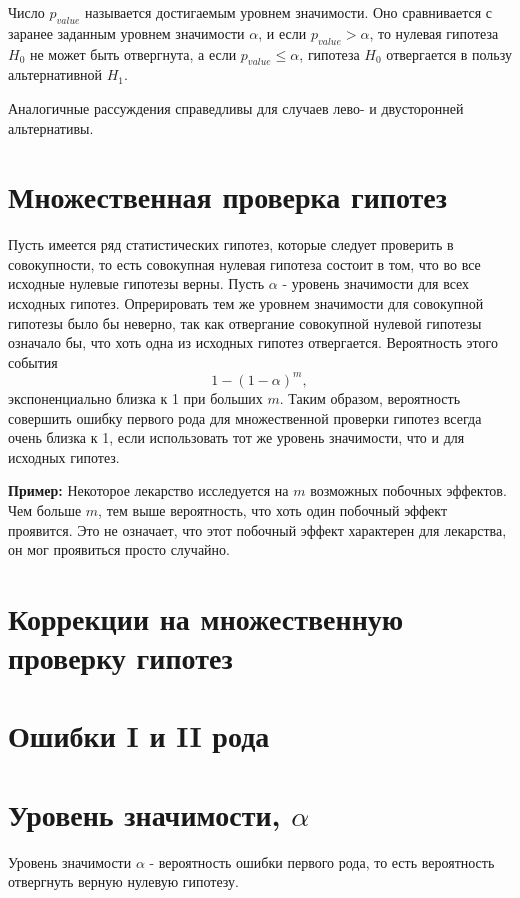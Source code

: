 Число $p_{value}$ называется достигаемым уровнем значимости. Оно сравнивается с заранее заданным уровнем значимости $\alpha$, и если $p_{value} > \alpha$, то нулевая гипотеза $H_0$ не может быть отвергнута, а если $p_{value} \leqslant \alpha$, гипотеза $H_0$ отвергается в пользу альтернативной $H_1$.

Аналогичные рассуждения справедливы для случаев лево- и двусторонней альтернативы.

\section{Множественная проверка гипотез}

Пусть имеется ряд статистических гипотез, которые следует проверить в совокупности, то есть совокупная нулевая гипотеза состоит в том, что во все исходные нулевые гипотезы верны. Пусть $\alpha$ - уровень значимости для всех исходных гипотез. Опрерировать тем же уровнем значимости для совокупной гипотезы было бы неверно, так как отвергание совокупной нулевой гипотезы означало бы, что хоть одна из исходных гипотез отвергается. Вероятность этого события
$$
1 - (1 - \alpha)^m,
$$
экспоненциально близка к 1 при больших $m$. Таким образом, вероятность совершить ошибку первого рода для множественной проверки гипотез всегда очень близка к 1, если использовать тот же уровень значимости, что и для исходных гипотез.

\textbf{Пример:} Некоторое лекарство исследуется на $m$ возможных побочных эффектов. Чем больше $m$, тем выше вероятность, что хоть один побочный эффект проявится. Это не означает, что этот побочный эффект характерен для лекарства, он мог проявиться просто случайно.

\section{Коррекции на множественную проверку гипотез}

\section{Ошибки I и II рода}


\section{Уровень значимости, $\alpha$}

Уровень значимости $\alpha$ - вероятность ошибки первого рода, то есть вероятность отвергнуть верную нулевую гипотезу.


